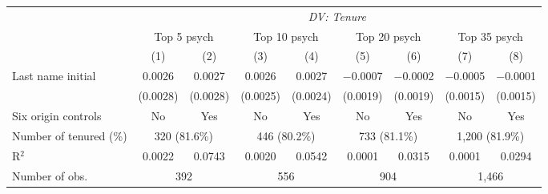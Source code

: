 \begin{tabular}{l *{8}{c}}
\toprule
& \multicolumn{8}{c}{\textit{DV: Tenure}} \\
 & \multicolumn{2}{c}{Top 5 psych} & \multicolumn{2}{c}{Top 10 psych} & \multicolumn{2}{c}{Top 20 psych} & \multicolumn{2}{c}{Top 35 psych} \\
\cmidrule(lr){2-3} \cmidrule(lr){4-5} \cmidrule(lr){6-7} \cmidrule(lr){8-9}
 & (1) & (2) & (3) & (4) & (5) & (6) & (7) & (8) \\
\midrule
Last name initial & 0.0026 & 0.0027 & 0.0026 & 0.0027 & $-$0.0007 & $-$0.0002 & $-$0.0005 & $-$0.0001 \\
 & (0.0028) & (0.0028) & (0.0025) & (0.0024) & (0.0019) & (0.0019) & (0.0015) & (0.0015) \\
\midrule[0.25pt]
Six origin controls & No & Yes & No & Yes & No & Yes & No & Yes \\
Number of tenured (\%) & \multicolumn{2}{c}{320 (81.6\%)} & \multicolumn{2}{c}{446 (80.2\%)} & \multicolumn{2}{c}{733 (81.1\%)} & \multicolumn{2}{c}{1,200 (81.9\%)} \\
R$^2$ & 0.0022 & 0.0743 & 0.0020 & 0.0542 & 0.0001 & 0.0315 & 0.0001 & 0.0294 \\
Number of obs. & \multicolumn{2}{c}{392} & \multicolumn{2}{c}{556} & \multicolumn{2}{c}{904} & \multicolumn{2}{c}{1,466} \\
\bottomrule
\end{tabular}

